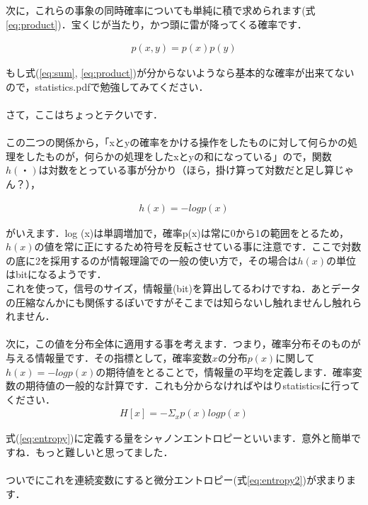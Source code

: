 \documentclass[11pt,a4paper,uplatex]{ujreport}
\begin{document}
次に，これらの事象の同時確率についても単純に積で求められます(式\ref{eq:product})．宝くじが当たり，かつ頭に雷が降ってくる確率です．

\begin{eqnarray}
\label{eq:product}
p(x,y) = p(x)p(y)
\end{eqnarray}

もし式(\ref{eq:sum}, \ref{eq:product})が分からないようなら基本的な確率が出来てないので，statistics.pdfで勉強してみてください．\\
\\
さて，ここはちょっとテクいです．\\
\\
この二つの関係から，「xとyの確率をかける操作をしたものに対して何らかの処理をしたものが，何らかの処理をしたxとyの和になっている」ので，関数$h(・)$は対数をとっている事が分かり（ほら，掛け算って対数だと足し算じゃん？），

\begin{eqnarray}
h(x) = -log p(x)
\end{eqnarray}

がいえます．log (x)は単調増加で，確率p(x)は常に0から1の範囲をとるため，$h(x)$の値を常に正にするため符号を反転させている事に注意です．ここで対数の底に2を採用するのが情報理論での一般の使い方で，その場合は$h(x)$の単位はbitになるようです．\\

これを使って，信号のサイズ，情報量(bit)を算出してるわけですね．あとデータの圧縮なんかにも関係するぽいですがそこまでは知らないし触れませんし触れられません．\\
\\

次に，この値を分布全体に適用する事を考えます．つまり，確率分布そのものが与える情報量です．その指標として，確率変数$x$の分布$p(x)$に関して$h(x)=-log p(x)$の期待値をとることで，情報量の平均を定義します．確率変数の期待値の一般的な計算です．これも分からなければやはりstatisticsに行ってください．\\

\begin{eqnarray}
\label{eq:entropy}
H[x] = - \Sigma_{x} p(x) log p(x)
\end{eqnarray}

式(\ref{eq:entropy})に定義する量をシャノンエントロピーといいます\cite{prml}．意外と簡単ですね．もっと難しいと思ってました．\\
\\

ついでにこれを連続変数にすると微分エントロピー(式\ref{eq:entropy2})が求まります．
\end{document}
